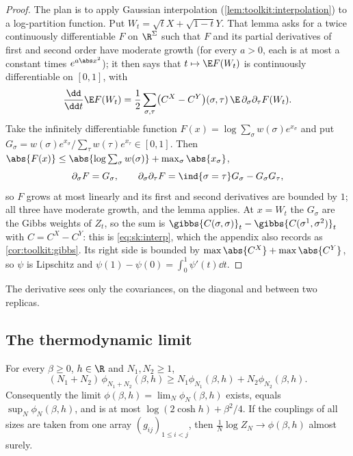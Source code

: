 \begin{refsection}
\begin{proof}
The plan is to apply Gaussian interpolation (\cref{lem:toolkit:interpolation}) to a log-partition function. Put $W_t=\sqrt tX+\sqrt{1-t}Y$. That lemma asks for a twice continuously differentiable $F$ on $\R^\Sigma$ such that $F$ and its partial derivatives of first and second order have moderate growth (for every $a>0$, each is at most a constant times $e^{a\abs x^2}$); it then says that $t\mapsto\E F(W_t)$ is continuously differentiable on $[0,1]$, with
\[
\frac{\dd}{\dd t}\E F(W_t)=\frac12\sum_{\sigma,\tau}\bigl(C^X-C^Y\bigr)(\sigma,\tau)\,\E\,\partial_\sigma\partial_\tau F(W_t).
\]
Take the infinitely differentiable function $F(x)=\log\sum_\sigma w(\sigma)e^{x_\sigma}$ and put $G_\sigma=w(\sigma)e^{x_\sigma}/\sum_\tau w(\tau)e^{x_\tau}\in[0,1]$. Then $\abs{F(x)}\le\abs{\log\sum_\sigma w(\sigma)}+\max_\sigma\abs{x_\sigma}$,
\[
\partial_\sigma F=G_\sigma,\qquad\partial_\sigma\partial_\tau F=\ind\{\sigma=\tau\}G_\sigma-G_\sigma G_\tau ,
\]
so $F$ grows at most linearly and its first and second derivatives are bounded by $1$; all three have moderate growth, and the lemma applies. At $x=W_t$ the $G_\sigma$ are the Gibbs weights of $Z_t$, so the sum is $\gibbs{C(\sigma,\sigma)}_t-\gibbs{C(\sigma^1,\sigma^2)}_t$ with $C=C^X-C^Y$: this is \eqref{eq:sk:interp}, which the appendix also records as \cref{cor:toolkit:gibbs}. Its right side is bounded by $\max\abs{C^X}+\max\abs{C^Y}$, so $\psi$ is Lipschitz and $\psi(1)-\psi(0)=\int_0^1\psi'(t)\dd t$.
\end{proof}

The derivative sees only the covariances, on the diagonal and between two replicas.

\subsection{The thermodynamic limit}\label{sec:sk:limit}

\begin{theorem}\label{thm:sk:guerratoninelli}
For every $\beta\ge0$, $h\in\R$ and $N_1,N_2\ge1$,
\[
(N_1+N_2)\,\phi_{N_1+N_2}(\beta,h)\ge N_1\phi_{N_1}(\beta,h)+N_2\phi_{N_2}(\beta,h).
\]
Consequently the limit $\phi(\beta,h)=\lim_N\phi_N(\beta,h)$ exists, equals $\sup_N\phi_N(\beta,h)$, and is at most $\log(2\cosh h)+\beta^2/4$. If the couplings of all sizes are taken from one array $(g_{ij})_{1\le i<j}$, then $\frac1N\log Z_N\to\phi(\beta,h)$ almost surely.
\end{theorem}


\end{refsection}
